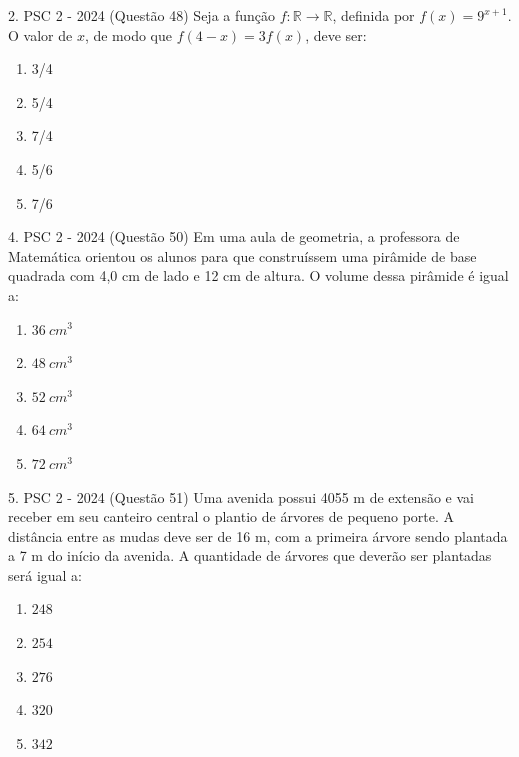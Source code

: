 \documentclass[aspectratio=169]{beamer}
\newif\ifusarcorvermelha
\newcommand{\vermelho}[1]{%
    \ifusarcorvermelha
        {\color{red}#1}%
    \else
        #1%
    \fi
}
\begin{document}
    \begin{frame}{2. PSC 2 - 2024 (Questão 48)}
        Seja a função $f: \mathbb{R} \to \mathbb{R}$, definida por $f(x)=9^{x+1}$. O valor de $x$, de modo que $f(4-x)=3f(x)$, deve ser:
        
            \begin{enumerate}[a]
                \item {3}/{4}
                \item {5}/{4}
                \item \vermelho{{7}/{4}} %
                \item {5}/{6}
                \item {7}/{6}
            \end{enumerate}
            
    \end{frame}

    \begin{frame}{4. PSC 2 - 2024 (Questão 50)}
        Em uma aula de geometria, a professora de Matemática orientou os alunos para que construíssem uma pirâmide de base quadrada com 4,0 cm de lado e 12 cm de altura. O volume dessa pirâmide é igual a:

         \begin{enumerate}[a]
                    \item $36 \ cm^{3}$
                    \item $48 \ cm^{3}$
                    \item $52 \ cm^{3}$
                    \item \vermelho{$64 \ cm^{3}$} %
                    \item $72 \ cm^{3}$
                \end{enumerate}        
    \end{frame}

    \begin{frame}{5. PSC 2 - 2024 (Questão 51)}
        Uma avenida possui 4055 m de extensão e vai receber em seu canteiro central o plantio de árvores de pequeno porte. A distância entre as mudas deve ser de 16 m, com a primeira árvore sendo plantada a 7 m do início da avenida. A quantidade de árvores que deverão ser plantadas será igual a:


         \begin{enumerate}[a]
                    \item $248$
                    \item \vermelho{$254$} %
                    \item $276$
                    \item $320$ 
                    \item $342$
                \end{enumerate}        
    \end{frame}
\end{document}
